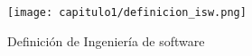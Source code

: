 
\begin{figure}[h!] \centering
\texttt{[image: capitulo1/definicion\_isw.png]} 
\caption{Definici\'on de Ingenier\'ia de software}
\label{figuragoogle}
\end{figure}

